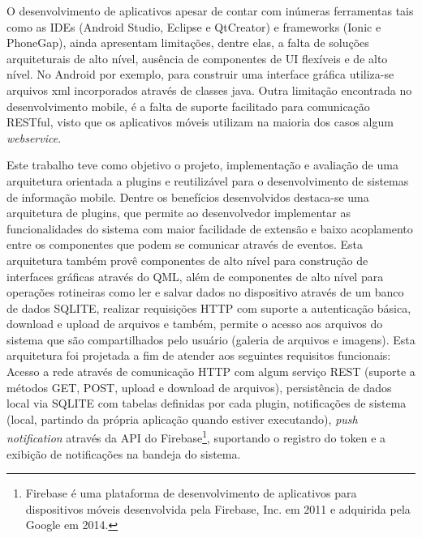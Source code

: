 O desenvolvimento de aplicativos apesar de contar com inúmeras ferramentas tais como as IDEs (Android Studio, Eclipse e QtCreator) e frameworks (Ionic e PhoneGap), ainda apresentam limitações, dentre elas, a falta de soluções arquiteturais de alto nível, ausência de componentes de UI flexíveis e de alto nível. No Android por exemplo, para construir uma interface gráfica utiliza-se arquivos xml incorporados através de classes java. Outra limitação encontrada no desenvolvimento mobile, é a falta de suporte facilitado para comunicação RESTful, visto que os aplicativos móveis utilizam na maioria dos casos algum \textit{webservice}.


Este trabalho teve como objetivo o projeto, implementação e avaliação de uma arquitetura orientada a plugins e reutilizável para o desenvolvimento de sistemas de informação mobile. Dentre os benefícios desenvolvidos destaca-se uma arquitetura de plugins, que permite ao desenvolvedor implementar as funcionalidades do sistema com maior facilidade de extensão e baixo acoplamento entre os componentes que podem se comunicar através de eventos. Esta arquitetura também provê componentes de alto nível para construção de interfaces gráficas através do QML, além de componentes de alto nível para operações rotineiras como ler e salvar dados no dispositivo através de um banco de dados SQLITE, realizar requisições HTTP com suporte a autenticação básica, download e upload de arquivos e também, permite o acesso aos arquivos do sistema que são compartilhados pelo usuário (galeria de arquivos e imagens). Esta arquitetura foi projetada a fim de atender aos seguintes requisitos funcionais: Acesso a rede através de comunicação HTTP com algum serviço REST (suporte a métodos GET, POST, upload e download de arquivos), persistência de dados local via SQLITE com tabelas definidas por cada plugin, notificações de sistema (local, partindo da própria aplicação quando estiver executando), \textit{push notification} através da API do Firebase\footnote{Firebase é uma plataforma de desenvolvimento de aplicativos para dispositivos móveis desenvolvida pela Firebase, Inc. em 2011 e adquirida pela Google em 2014.}, suportando o registro do token e a exibição de notificações na bandeja do sistema.


